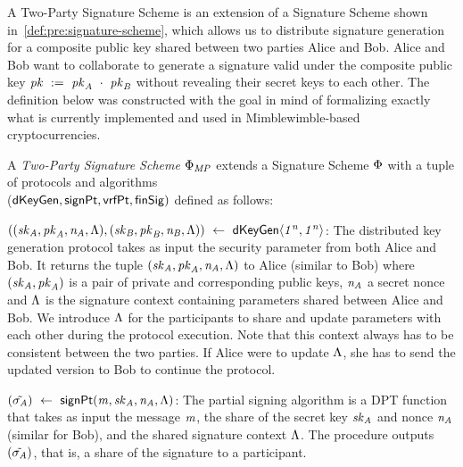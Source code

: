 A Two-Party Signature Scheme is an extension of a Signature Scheme shown in~\cref{def:pre:signature-scheme}, which allows us to distribute signature generation for a composite public key shared between two parties Alice and Bob.
Alice and Bob want to collaborate to generate a signature valid under the composite public key $\mathit{pk} ~:=~ \mathit{pk}_{\mathit{A}} ~\cdot~ \mathit{pk}_{\mathit{B}}$ without revealing their secret keys to each other.
The definition below was constructed with the goal in mind of formalizing exactly what is currently implemented and used in Mimblewimble-based cryptocurrencies.

\begin{definition}
    \label{def:sig:two-party-sig}

    A \emph{Two-Party Signature Scheme $\Phi_{\mathit{MP}}$} extends a Signature Scheme $\Phi$ with a tuple of protocols and algorithms\\
    ($\mathsf{dKeyGen}, \mathsf{signPt} , \mathsf{vrfPt}, \mathsf{finSig})$ defined as follows:

    \begin{asparaitem}
        \item $((\mathit{sk}_{\mathit{A}}, \mathit{pk}_{\mathit{A}}, \mathit{\mathit{n}_{\mathit{A}}}, \Lambda), (\mathit{sk}_{\mathit{B}}, \mathit{pk}_{\mathit{B}}, \mathit{\mathit{n}_{\mathit{B}}}, \Lambda)) ~\leftarrow~ \mathsf{dKeyGen}\langle \mathit{1^n}, \mathit{1^n} \rangle$: The distributed key generation protocol takes as input the security parameter from both Alice and Bob.
        It returns the tuple $(\mathit{sk}_{\mathit{A}}, \mathit{pk}_{\mathit{A}}, \mathit{\mathit{n}_{\mathit{A}}}, \Lambda)$ to Alice (similar to Bob) where $(\mathit{sk}_{\mathit{A}}, \mathit{pk}_{\mathit{A}})$ is a pair of private and corresponding public keys, $\mathit{\mathit{n}_{\mathit{A}}}$ a secret nonce and $\Lambda$ is the signature context containing parameters shared between Alice and Bob.
        We introduce $\Lambda$ for the participants to share and update parameters with each other during the protocol execution.
        Note that this context always has to be consistent between the two parties.
        If Alice were to update $\Lambda$, she has to send the updated version to Bob to continue the protocol.

        \item $(\tilde{\sigma_{\mathit{A}}}) ~\leftarrow~ \mathsf{signPt}(\mathit{m}, \mathit{sk}_{\mathit{A}}, \mathit{\mathit{n}_{\mathit{A}}}, \Lambda)$: The partial signing algorithm is a DPT function that takes as input the message $\mathit{m}$, the share of the secret key $\mathit{sk}_{\mathit{A}}$ and nonce $\mathit{\mathit{n}_{\mathit{A}}}$ (similar for Bob), and the shared signature context $\Lambda$. The procedure outputs $(\tilde{\sigma_{\mathit{A}}})$, that is, a share of the signature to a participant.


\end{asparaitem}
\end{definition}
